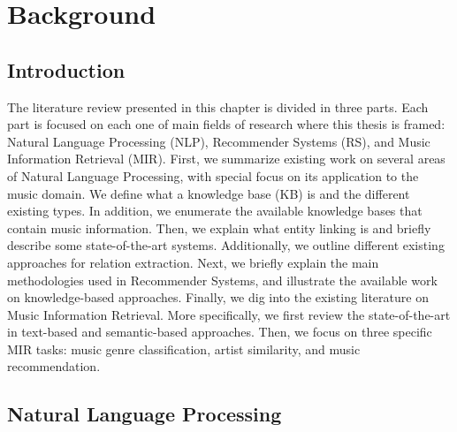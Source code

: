 
\chapter{Background}
\label{sec:SOA}

\section{Introduction}
\label{sec:SOA:Introduction}

The literature review presented in this chapter is divided in three parts. Each part is focused on each one of main fields of research where this thesis is framed: Natural Language Processing (NLP), Recommender Systems (RS), and Music Information Retrieval (MIR).
First, we summarize existing work on several areas of Natural Language Processing, with special focus on its application to the music domain. 
We define what a knowledge base (KB) is and the different existing types. In addition, we enumerate the available knowledge bases that contain music information.
Then, we explain what entity linking is and briefly describe some state-of-the-art systems. Additionally, we outline different existing approaches for relation extraction. 
Next, we briefly explain the main methodologies used in Recommender Systems, and illustrate the available work on knowledge-based approaches.
Finally, we dig into the existing literature on Music Information Retrieval. More specifically, we first review the state-of-the-art in text-based and semantic-based approaches. Then, we focus on three specific MIR tasks: music genre classification, artist similarity, and music recommendation.


\section{Natural Language Processing}
\label{sec:SOA:nlu}

